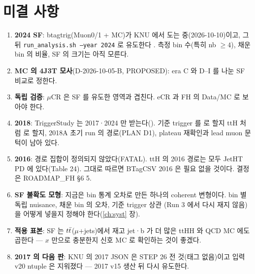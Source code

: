 \section{미결 사항}\label{sec:trigger-open}

\begin{openq}
\begin{enumerate}
\item \textbf{2024 SF}: btagtrig(Muon0/1 + MC)가 KNU 에서 도는 중(2026-10-10)이고, 그 뒤 \texttt{run\_analysis.sh --year 2024} 로 유도한다
  . 측정 bin 수(특히 nb $\geq 4$), 채운 bin 의 비율, SF 의 크기는 아직 모른다.
\item \textbf{MC 의 4J3T 모사}(D-2026-10-05-B, PROPOSED): era C 와 D--I 를 나눈 SF 비교로 정한다.
\item \textbf{독립 검증}: $\mu$CR 은 SF 를 유도한 영역과 겹친다. eCR 과 FH 의 Data/MC 로 보아야 한다.
\item \textbf{2018}: TriggerStudy 는 2017·2024 만 받는다(). 기준 trigger 를  로 할지 ttH 처럼
   로 할지, 2018A 초기 run 의 경로(PLAN D1), plateau 재확인과 lead muon 문턱이 남아 있다.
\item \textbf{2016}: 경로 집합이 정의되지 않았다(FATAL). ttH 의 2016 경로는 모두 JetHT PD 에 있다(Table 24).
  그대로 따르면 BTagCSV 2016 은 필요 없을 것이다\tagours. 결정은 ROADMAP\_FH §6 5.
\item \textbf{SF 불확도 모형}: 지금은 bin 통계 오차로 만든 하나의 coherent 변형이다. bin 별 독립 nuisance, 채운 bin 의 오차, 기준 trigger 상관
  (Run 3 에서 다시 재지 않음)을 어떻게 넣을지 정해야 한다(\ref{ch:syst} 장)\tagopen.
\item \textbf{적용 표본}: SF 는 $t\bar{t}$($\mu$+jets)에서 재고 jet·b 가 더 많은 ttHH 와 QCD MC 에도 곱한다 --- $x$ 만으로 충분한지 신호 MC 로
  확인하는 것이 좋겠다\tagours.
\item \textbf{2017 의 다음 판}: KNU 의 2017 JSON 은 STEP 26 전 것(태그 없음)이고 입력 v20 ntuple 은 지워졌다 ---
  2017 v15 생산 뒤 다시 유도한다\tagours.
\end{enumerate}
\end{openq}
